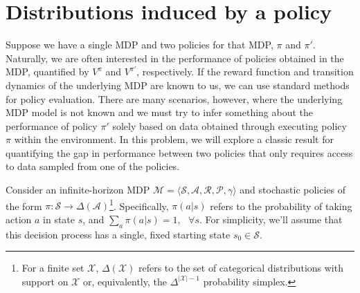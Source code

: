 \section{Distributions induced by a policy}

Suppose we have a single MDP and two policies for that MDP, $\pi$ and $\pi'$. Naturally, we are often interested in the performance of policies obtained in the MDP, quantified by $V^{\pi}$ and $V^{\pi'}$, respectively. If the reward function and transition dynamics of the underlying MDP are known to us, we can use standard methods for policy evaluation. There are many scenarios, however, where the underlying MDP model is not known and we must try to infer something about the performance of policy $\pi'$ solely based on data obtained through executing policy $\pi$ within the environment. In this problem, we will explore a classic result for quantifying the gap in performance between two policies that only requires access to data sampled from one of the policies. 

Consider an infinite-horizon MDP $\mathcal{M} = \langle \mathcal{S}, \mathcal{A}, \mathcal{R}, \mathcal{P}, \gamma \rangle$ and stochastic policies of the form $\pi: \mathcal{S} \rightarrow \Delta(\mathcal{A})$\footnote{For a finite set $\mathcal{X}$, $\Delta(\mathcal{X})$ refers to the set of categorical distributions with support on $\mathcal{X}$ or, equivalently, the $\Delta^{|\mathcal{X}|-1}$ probability simplex.}. Specifically, $\pi(a|s)$ refers to the probability of taking action $a$ in state $s$, and $\sum_a \pi(a|s) = 1, \text{ } \forall s$. For simplicity, we'll assume that this decision process has a single, fixed starting state $s_{0} \in \mathcal{S}$. 


\begin{enumerate}[(a)]

	

	

	

\end{enumerate}